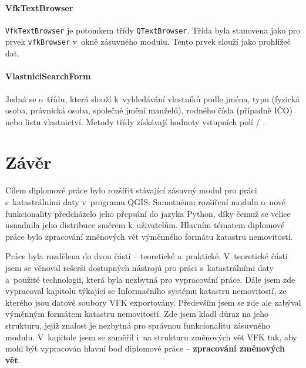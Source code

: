\documentclass[a4paper,12pt,oneside]{book}
\begin{document}
\subsubsection{VfkTextBrowser}
\texttt{VfkTextBrowser} je potomkem třídy \texttt{QTextBrowser}. Třída
byla stanovena jako  pro prvek \texttt{vfkBrowser} v~okně
zásuvného modulu. Tento prvek slouží jako prohlížeč dat.

\subsubsection{VlastniciSearchForm}
Jedná se o~třídu, která slouží k~vyhledávání vlastníků podle jména,
typu (fyzická osoba, právnická osoba, společné jmění manželů), rodného
čísla (případně IČO) nebo listu vlastnictví. Metody třídy získávají
hodnoty vstupních polí / .


\clearpage
{}       %
\chapter*{Závěr}


Cílem diplomové práce bylo rozšířit stávající zásuvný modul pro práci
s~katastrálními daty v~programu QGIS. Samotnému rozšíření modulu
o~nové funkcionality předcházelo jeho přepsání do jazyka Python, díky
čemuž se velice usnadnila jeho distribuce směrem k~uživatelům. Hlavním
tématem diplomové práce bylo zpracování změnových vět výměnného
formátu katastru nemovitostí.

Práce byla rozdělena do dvou částí -- teoretické
a~praktické. V~teoretické části jsem se věnoval rešerši dostupných
nástrojů pro práci s~katastrálními daty a~použité
technologii, která byla nezbytná pro vypracování práce. Dále jsem zde
vypracoval kapitolu týkající se Informačního systému katastru
nemovitostí, ze kterého jsou datové soubory VFK exportovány. Především
jsem se zde ale zabýval výměnným formátem katastru nemovitostí. Zde
jsem kladl důraz na jeho strukturu, jejíž znalost je nezbytná pro
správnou funkcionalitu zásuvného modulu. V~kapitole jsem se zaměřil
i~na strukturu změnových vět VFK tak, aby mohl být vypracován hlavní
bod diplomové práce -- \textbf{zpracování změnových vět}.
\end{document}
